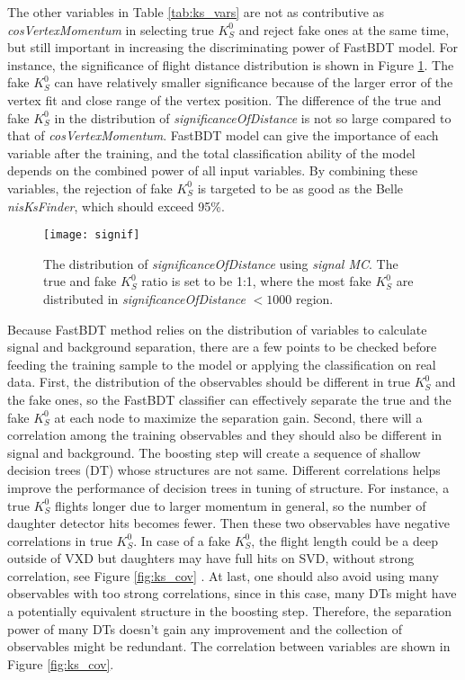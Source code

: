 The other variables in Table \ref{tab:ks_vars} are not as contributive as  \textit{cosVertexMomentum} in selecting true $K_S^0$ and reject fake ones at the same time, but still important in increasing the discriminating power of FastBDT model. For instance, the significance of flight distance distribution is shown in Figure \ref{fig:signi}. The fake $K_S^0$ can have relatively smaller significance because of the larger error of the vertex fit and close range of the vertex position. The difference of the true and fake $K_S^0$ in the distribution of \textit{significanceOfDistance} is not so large compared to that of \textit{cosVertexMomentum}. FastBDT model can give the importance of each variable after the training, and the total classification ability of the model depends on the combined power of all input variables. By combining these variables, the rejection of fake $K_S^0$ is targeted to be as good as the Belle \textit{nis\textit{KsFinder}}, which should exceed 95\%. 
\begin{figure}[htbp]
	\centering
	\texttt{[image: signif]}
	\caption{The distribution of \textit{significanceOfDistance} using \textit{signal MC}. The true and fake $K_S^0$ ratio is set to be 1:1, where the most fake $K_S^0$ are distributed in \textit{significanceOfDistance} $<1000$ region.}
	\label{fig:signi}
\end{figure}


Because FastBDT method relies on the distribution of variables to calculate signal and background separation, there are a few points to be checked before feeding the training sample to the model or applying the classification on real data. First, the distribution of the observables should be different in true $K_S^0$ and the fake ones, so the FastBDT classifier can effectively separate the true and the fake $K_S^0$ at each node to maximize the separation gain. Second, there will a correlation among the training observables and they should also be different in signal and background. The boosting step will create a sequence of shallow decision trees (DT) whose structures are not same. Different correlations helps improve the performance of decision trees in tuning of structure. For instance, a true $K_S^0$ flights longer due to larger momentum in general, so the number of daughter detector hits becomes fewer. Then these two observables have negative correlations in true $K_S^0$. In case of a fake $K_S^0$, the flight length could be a deep outside of VXD  but daughters may have full hits on SVD, without strong correlation, see Figure  \ref{fig:ks_cov} . At last, one should also avoid using many observables with too strong correlations, since in this case, many DTs might have a potentially equivalent structure in the boosting step. Therefore, the separation power of many DTs doesn't gain any improvement and the collection of observables might be redundant. The correlation between variables are shown in Figure \ref{fig:ks_cov}.

